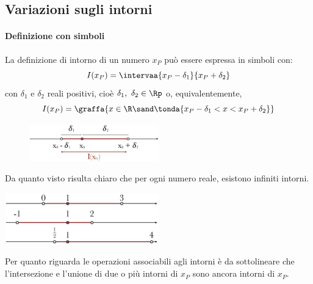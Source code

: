 \subsection{Variazioni sugli intorni}

% 

\paragraph{Definizione con simboli}

La definizione di intorno di un numero \(x_P\) può essere espressa in simboli 
con:
\[I(x_P)=\intervaa{x_P-\delta_1}{x_P+\delta_2}\]
con \(\delta_1\) e \(\delta_2\) reali positivi, cioè 
\(\delta_1,~ \delta_2 \in \Rp\) o, equivalentemente,
\[%
I(x_P)=\graffa{x \in \R \sand \tonda{x_P-\delta_1 < x < x_P+\delta_2}}\]

\begin{figure}[h!]
\centering

\includegraphics[width=0.5\textwidth]{img/top_1.png}%
\end{figure}
  
Da quanto visto risulta chiaro che per ogni numero reale, esistono infiniti 
intorni.

\begin{center}
\includegraphics[width=0.5\textwidth]{img/top_7.png}%
\end{center}
Per quanto riguarda le operazioni associabili agli intorni è da sottolineare 
che l'intersezione e l'unione di due o più intorni di \(x_P\) sono ancora 
intorni di \(x_P\).

